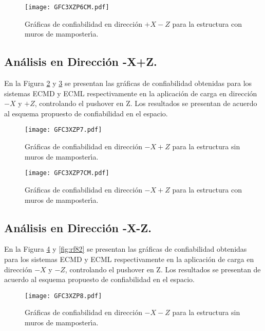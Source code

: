 \begin{figure} [htbp]
\centering
\texttt{[image: GFC3XZP6CM.pdf]}
\caption{Gr\'aficas de confiabilidad en direcci\'on $+X-Z$ para la estructura con muros de mamposter\'{\i}a.}
\label{fig:rf70}
\end{figure}

\newpage

\subsection{An\'alisis en Direcci\'on -X+Z.}

En la Figura \ref{fig:rf75} y \ref{fig:rf76} se presentan las gr\'aficas de confiabilidad obtenidas para los sistemas ECMD y ECML respectivamente en la aplicaci\'on de carga en direcci\'on $-X$ y $+Z$, controlando el pushover en Z. Los resultados se presentan de acuerdo al esquema propuesto de confiabilidad en el espacio.

\begin{figure} [htbp]
\centering
\texttt{[image: GFC3XZP7.pdf]}
\caption{Gr\'aficas de confiabilidad en direcci\'on $-X+Z$ para la estructura sin muros de mamposter\'{\i}a.}
\label{fig:rf75}
\end{figure}

\begin{figure} [htbp]
\centering
\texttt{[image: GFC3XZP7CM.pdf]}
\caption{Gr\'aficas de confiabilidad en direcci\'on $-X+Z$ para la estructura con muros de mamposter\'{\i}a.}
\label{fig:rf76}
\end{figure}

\newpage

\subsection{An\'alisis en Direcci\'on -X-Z.}

En la Figura \ref{fig:rf81} y \ref{fig:rf82} se presentan las gr\'aficas de confiabilidad obtenidas para los sistemas ECMD y ECML respectivamente en la aplicaci\'on de carga en direcci\'on $-X$ y $-Z$, controlando el pushover en Z. Los resultados se presentan de acuerdo al esquema propuesto de confiabilidad en el espacio.

\begin{figure} [htbp]
\centering
\texttt{[image: GFC3XZP8.pdf]}
\caption{Gr\'aficas de confiabilidad en direcci\'on $-X-Z$ para la estructura sin muros de mamposter\'{\i}a.}
\label{fig:rf81}
\end{figure}

